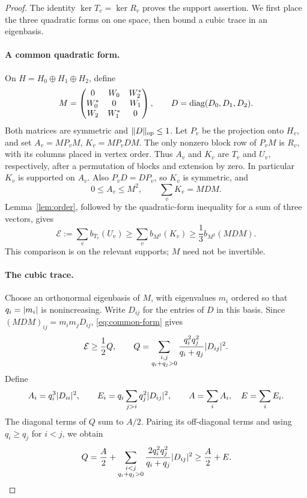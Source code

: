 \begin{proof}
The identity \(\ker T_v=\ker R_v\) proves the support assertion.
We first place the three quadratic forms on one space, then bound a
cubic trace in an eigenbasis.

\paragraph{A common quadratic form.}
On \(H=H_0\oplus H_1\oplus H_2\), define
\[
 M=\begin{pmatrix}
      0&W_0&W_2^*\\
      W_0^*&0&W_1\\
      W_2&W_1^*&0
    \end{pmatrix},
 \qquad D=\operatorname{diag}(D_0,D_1,D_2).
\]
Both matrices are symmetric and \(\lVert D\rVert_{\mathrm{op}}\le1\).
Let \(P_v\) be the projection onto \(H_v\), and set
\(A_v=MP_vM\), \(K_v=MP_vDM\).
The only nonzero block row of \(P_vM\) is \(R_v\), with its columns
placed in vertex order. Thus \(A_v\) and \(K_v\) are \(T_v\) and
\(U_v\), respectively, after a permutation of blocks and extension
by zero. In particular \(K_v\) is supported on \(A_v\).
Also \(P_vD=DP_v\), so \(K_v\) is symmetric, and
\[
 0\le A_v\le M^2,\qquad \sum_vK_v=MDM.
\]
Lemma~\ref{lem:order}, followed by the quadratic-form inequality for
a sum of three vectors, gives
\begin{equation}\label{eq:common-form}
 \mathcal E:=\sum_v b_{T_v}(U_v)
 \ge\sum_v b_{M^2}(K_v)
 \ge\frac13b_{M^2}(MDM).
\end{equation}
This comparison is on the relevant supports; \(M\) need not be
invertible.

\paragraph{The cubic trace.}
Choose an orthonormal eigenbasis of \(M\), with eigenvalues \(m_i\)
ordered so that \(q_i=\lvert m_i\rvert\) is nonincreasing. Write \(D_{ij}\)
for the entries of \(D\) in this basis. Since
\((MDM)_{ij}=m_im_jD_{ij}\), \eqref{eq:common-form} gives
\begin{equation}\label{eq:Q}
 \mathcal E\ge\frac12 Q,\qquad
 Q=\sum_{\substack{i,j\\q_i+q_j>0}}
          \frac{q_i^2q_j^2}{q_i+q_j}\lvert D_{ij}\rvert^2.
\end{equation}
Define
\[
 A_i=q_i^3\lvert D_{ii}\rvert^2,\qquad
 E_i=q_i\sum_{j>i}q_j^2\lvert D_{ij}\rvert^2,\qquad
 A=\sum_iA_i,\quad E=\sum_iE_i.
\]
The diagonal terms of \(Q\) sum to \(A/2\). Pairing its off-diagonal
terms and using \(q_i\ge q_j\) for \(i<j\), we obtain
\begin{equation}\label{eq:AE}
 Q=\frac A2+
 \sum_{\substack{i<j\\q_i+q_j>0}}
        \frac{2q_i^2q_j^2}{q_i+q_j}\lvert D_{ij}\rvert^2
 \ge \frac A2+E.
\end{equation}


\end{proof}
